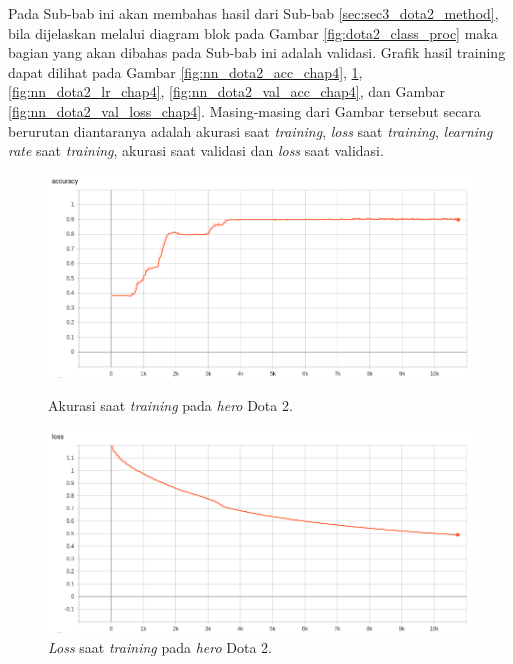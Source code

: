 Pada Sub-bab ini akan membahas hasil dari Sub-bab \ref{sec:sec3_dota2_method}, bila dijelaskan melalui diagram blok pada Gambar \ref{fig:dota2_class_proc} maka bagian yang akan dibahas pada Sub-bab ini adalah validasi. Grafik hasil training dapat dilihat pada Gambar \ref{fig:nn_dota2_acc_chap4}, \ref{fig:nn_dota2_loss_chap4}, \ref{fig:nn_dota2_lr_chap4}, \ref{fig:nn_dota2_val_acc_chap4}, dan Gambar \ref{fig:nn_dota2_val_loss_chap4}. Masing-masing dari Gambar tersebut secara berurutan diantaranya adalah akurasi saat \textit{training}, \textit{loss} saat \textit{training}, \textit{learning rate} saat \textit{training}, akurasi saat validasi dan \textit{loss} saat validasi. 
\vspace{2ex}

\begin{figure} [!h] \centering
	\includegraphics[scale=0.44]{img/callback_acc_chap4.png}
	\caption{Akurasi saat \textit{training} pada \textit{hero} Dota 2.}
	\label{fig:nn_dota2_acc_chap4}
	\vspace{4ex}

	\includegraphics[scale=0.44]{img/callback_loss_chap4.png}
	\caption{\textit{Loss} saat \textit{training} pada \textit{hero} Dota 2.}
	\label{fig:nn_dota2_loss_chap4}
\end{figure}
\clearpage

